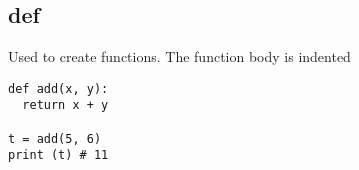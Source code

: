 \subsection{def}
Used to create functions. The function body is indented

\begin{lstlisting}
def add(x, y):
  return x + y

t = add(5, 6)
print (t) # 11
\end{lstlisting}
